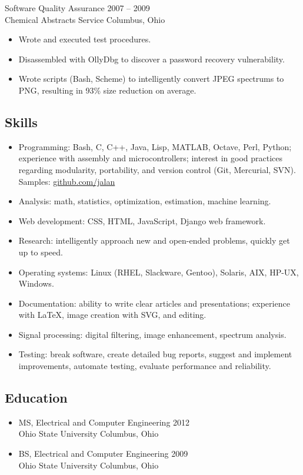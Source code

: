 \documentclass[12pt]{report}
\begin{document}
Software Quality Assurance                              \hfill 2007 -- 2009 \\
Chemical Abstracts Service                              \hfill Columbus, Ohio
\begin{itemize}
\item Wrote and executed test procedures.
\item Disassembled with OllyDbg to discover a password recovery vulnerability.
\item Wrote scripts (Bash, Scheme) to intelligently convert JPEG spectrums to PNG, resulting in 93\% size reduction on average.
\end{itemize}

\subsection*{Skills}
\begin{itemize}
\item Programming: Bash, C, C++, Java, Lisp, MATLAB, Octave, Perl, Python; experience with assembly and microcontrollers; interest in good practices regarding modularity, portability, and version control (Git, Mercurial, SVN). Samples: \href{http://github.com/jalan}{github.com/jalan}
\item Analysis: math, statistics, optimization, estimation, machine learning.
\item Web development: CSS, HTML, JavaScript, Django web framework.
\item Research: intelligently approach new and open-ended problems, quickly get up to speed.
\item Operating systems: Linux (RHEL, Slackware, Gentoo), Solaris, AIX, HP-UX, Windows.
\item Documentation: ability to write clear articles and presentations; experience with \LaTeX, image creation with SVG, and editing.
\item Signal processing: digital filtering, image enhancement, spectrum analysis.
\item Testing: break software, create detailed bug reports, suggest and implement improvements, automate testing, evaluate performance and reliability.
\end{itemize}

\subsection*{Education}
\begin{itemize}
\item MS, Electrical and Computer Engineering \hfill 2012 \\
Ohio State University                         \hfill Columbus, Ohio \\

\item BS, Electrical and Computer Engineering \hfill 2009 \\
Ohio State University                         \hfill Columbus, Ohio \\
\end{itemize}
\end{document}
